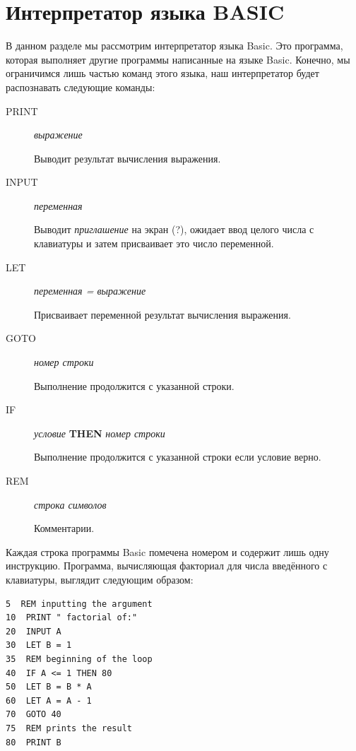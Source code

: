 \section{Интерпретатор языка BASIC}
\label{sec:basic_interpreter}

В данном разделе мы рассмотрим интерпретатор языка Basic. Это программа, которая 
выполняет другие программы написанные на языке Basic. Конечно, мы ограничимся 
лишь частью команд этого языка, наш интерпретатор будет распознавать следующие 
команды:

\begin{description}
	\item[PRINT] {\it выражение}

	Выводит результат вычисления выражения.

	\item[INPUT] {\it переменная}

	Выводит {\it приглашение} на экран (?), ожидает ввод целого числа с 
клавиатуры и затем присваивает это число переменной.

	\item[LET] {\it переменная = выражение}

	Присваивает переменной результат вычисления выражения.

	\item[GOTO] {\it номер строки}

	Выполнение продолжится с указанной строки.

	\item[IF] {\it условие} {\bf THEN} {\it номер строки}

	Выполнение продолжится с указанной строки если условие верно.
	
	\item[REM] {\it строка символов}

	Комментарии.
\end{description}

Каждая строка программы Basic помечена номером и содержит лишь одну инструкцию. 
Программа, вычисляющая факториал для числа введённого с клавиатуры, выглядит 
следующим образом:

\begin{lstlisting}[language={[Visual]Basic}]
 5  REM inputting the argument
10  PRINT " factorial of:"
20  INPUT A
30  LET B = 1 
35  REM beginning of the loop
40  IF A <= 1 THEN 80 
50  LET B = B * A
60  LET A = A - 1
70  GOTO 40 
75  REM prints the result
80  PRINT B
\end{lstlisting}

